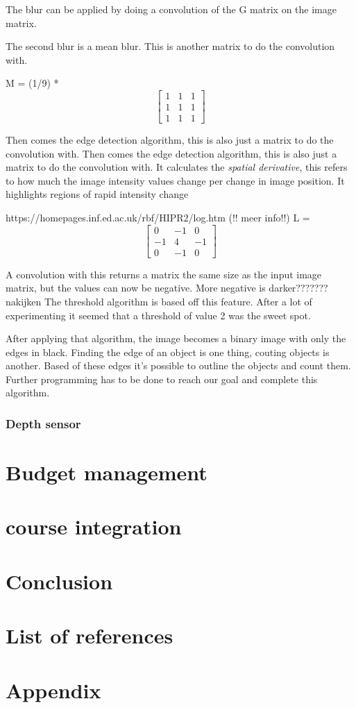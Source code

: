 \documentclass{article}
\begin{document}
The blur can be applied by doing a convolution of the G matrix on the image matrix.

The second blur is a mean blur. This is another matrix to do the convolution with.

M = (1/9) * \[
\begin{bmatrix}
	1&1&1\\
	1&1&1\\
	1&1&1
\end{bmatrix}
\]

Then comes the edge detection algorithm, this is also just a matrix to do the convolution with.
Then comes the edge detection algorithm, this is also just a matrix to do the convolution with. It calculates the \textit{spatial  derivative}, this refers to how much the image intensity values change per change in image position. It highlights regions of rapid intensity change

https://homepages.inf.ed.ac.uk/rbf/HIPR2/log.htm
(!! meer info!!)
L = \[
\begin{bmatrix}
	0&-1&0\\
	-1&4&-1\\
	0&-1&0
\end{bmatrix}
\]

A convolution with this returns a matrix the same size as the input image matrix, but the values can now be negative. More negative is darker??????? nakijken
The threshold algorithm is based off this feature. After a lot of experimenting it seemed that a threshold of value 2 was the sweet spot.

After applying that algorithm, the image becomes a binary image with only the edges in black. Finding the edge of an object is one thing, couting objects is another. Based of these edges it's possible to outline the objects and count them. Further programming has to be done to reach our goal and complete this algorithm.



\subsubsection{Depth sensor}

\section{Budget management}

\section{course integration}

\section{Conclusion}

\section{List of references}

\section{Appendix}
\end{document}
